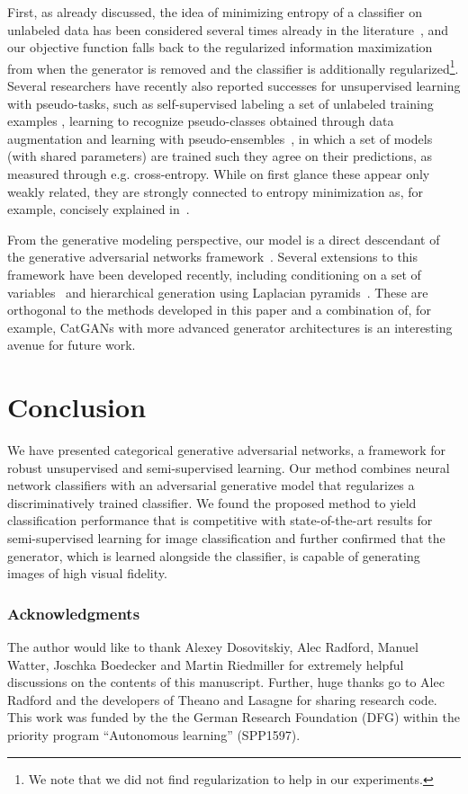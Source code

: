 \documentclass{article} \usepackage{iclr2016_conference,times}
\begin{document}
First, as already discussed, the idea of minimizing entropy of a
classifier on unlabeled data has been considered several times already
in the literature~\citep{Bridle_91,Grandvalet_2004,Krause_2010}, and
our objective function falls back to the regularized information
maximization from \citet{Krause_2010} when the generator is removed
and the classifier is additionally  regularized\footnote{We
  note that we did not find  regularization to help in our
  experiments.}. Several researchers have recently also reported
successes for unsupervised learning with pseudo-tasks, such as
self-supervised labeling a set of unlabeled training examples
\citep{Lee_ICML_WCLR2013}, learning to recognize pseudo-classes obtained through
data augmentation \citep{Dosovits_NIPS2014} and learning with
pseudo-ensembles~\citep{Bachman_NIPS2014}, in which a set of models
(with shared parameters) are trained such they agree on their
predictions, as measured through e.g. cross-entropy. While on first
glance these appear only weakly related, they are strongly connected to
entropy minimization as, for example, concisely explained in~\citet{Bachman_NIPS2014}.  

From the generative modeling perspective, our model is a direct
descendant of the generative adversarial networks
framework~\citep{Goodfellow_NIPS2014}. Several extensions to this
framework have been developed recently, including conditioning on a
set of variables~\citep{Gauthier_2014,Mirza_2014} and hierarchical generation using
Laplacian pyramids~\citep{Denton_NIPS2015}. These are orthogonal to
the methods developed in this paper and a combination of, for example,
CatGANs with more advanced generator architectures is an interesting
avenue for future work.

\section{Conclusion}
We have presented categorical generative adversarial networks, a framework for robust unsupervised and semi-supervised learning. Our method combines neural network classifiers with an adversarial generative model that regularizes a discriminatively trained classifier. We found the proposed method to yield classification performance that is competitive with state-of-the-art results for semi-supervised learning for image classification and further confirmed that the generator, which is learned alongside the classifier, is capable of generating images of high visual fidelity.

\subsubsection*{Acknowledgments}
The author would like to thank Alexey Dosovitskiy, Alec Radford, Manuel Watter, Joschka Boedecker and Martin Riedmiller for extremely helpful discussions on the contents of this manuscript. Further, huge thanks go to Alec Radford and the developers of Theano \citep{Theano_scipy,Theano_2012} and Lasagne \citep{Lasagne_2015} for sharing research code. This work was funded by the the German Research Foundation (DFG) within the priority program ``Autonomous learning'' (SPP1597).
\end{document}
